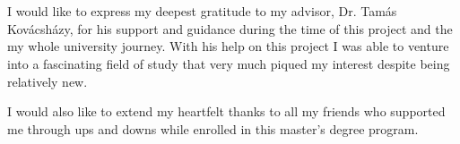 \chapter*{\koszonetnyilvanitas}

I would like to express my deepest gratitude to my advisor, Dr. Tamás Kovácsházy, for his support and guidance during the time of this project and the my whole university journey. With his help on this project I was able to venture into a fascinating field of study that very much piqued my interest despite being relatively new.

I would also like to extend my heartfelt thanks to all my friends who supported me through ups and downs while enrolled in this master's degree program.
